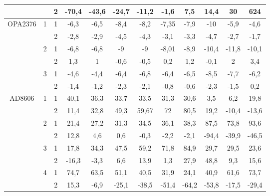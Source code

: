\begin{table}[H]
\begin{adjustwidth}{-1em}{}
\begin{tabular}{|c|c|c|c|c|c|c|c|c|c|c|c|}
  \cline{3-12}          &       & 2     & -70,4 & -43,6 & -24,7 & -11,2 & -1,6  & 7,5   & 14,4  & 30    & 624 \bigstrut\\
      \hline
      \multicolumn{1}{|c|}{\multirow{6}[12]{*}{OPA2376}} & \multirow{2}[4]{*}{1} & 1     & -6,3  & -6,5  & -8,4  & -8,2  & -7,35 & -7,9  & -10   & -5,9  & -4,6 \bigstrut\\
  \cline{3-12}          &       & 2     & -2,8  & -2,9  & -4,5  & -4,3  & -3,1  & -3,3  & -4,7  & -2,7  & -1,7 \bigstrut\\
  \cline{2-12}          & \multirow{2}[4]{*}{2} & 1     & -6,8  & -6,8  & -9    & -9    & -8,01 & -8,9  & -10,4 & -11,8 & -10,1 \bigstrut\\
  \cline{3-12}          &       & 2     & 1,3   & 1     & -0,6  & -0,5  & 0,2   & 1,2   & -0,1  & 2     & 3,4 \bigstrut\\
  \cline{2-12} Fulihao   & \multirow{2}[4]{*}{3} & 1     & -4,6  & -4,4  & -6,4  & -6,8  & -6,4  & -6,5  & -8,5  & -7,7  & -6,2 \bigstrut\\
  \cline{3-12}          &       & 2     & -1,4  & -1,2  & -2,3  & -2,1  & -0,8  & -0,6  & -2,3  & -1,5  & 0,2 \bigstrut\\
      \hline
      \multicolumn{1}{|c|}{\multirow{10}[20]{*}{AD8606}} & \multirow{2}[4]{*}{1} & 1     & 40,1  & 36,3  & 33,7  & 33,5  & 31,3  & 30,6  & 3,5   & 6,2   & 19,8 \bigstrut\\
  \cline{3-12}          &       & 2     & 11,4  & 32,8  & 49,3  & 59,67 & 72    & 80,5  & 19,2  & -10,4 & -13,6 \bigstrut\\
  \cline{2-12}          & \multirow{2}[4]{*}{2} & 1     & 21,4  & 27,2  & 31,3  & 34,5  & 36,1  & 38,3  & 87,5  & 73,8  & 93,6 \bigstrut\\
  \cline{3-12}          &       & 2     & 12,8  & 4,6   & 0,6   & -0,3  & -2,2  & -2,1  & -94,4 & -39,9 & -46,5 \bigstrut\\
  \cline{2-12}          & \multirow{2}[4]{*}{3} & 1     & 17,8  & 34,3  & 47,5  & 59,2  & 71,8  & 84,9  & 29,7  & 29,5  & 23,6 \bigstrut\\
  \cline{3-12}          &       & 2     & -16,3 & -3,3  & 6,6   & 13,9  & 1,3   & 27,9  & 48,8  & 9,3   & 15,6 \bigstrut\\
  \cline{2-12}          & \multirow{2}[4]{*}{4} & 1     & 74,7  & 63,5  & 51,1  & 40,5  & 31,9  & 24,1  & 40,9  & 61,6  & 73,7 \bigstrut\\
  \cline{3-12}          &       & 2     & 15,3  & -6,9  & -25,1 & -38,5 & -51,4 & -64,2 & -53,8 & -17,5 & -29,4 \bigstrut\\

\end{tabular}
\end{adjustwidth}
\end{table}
